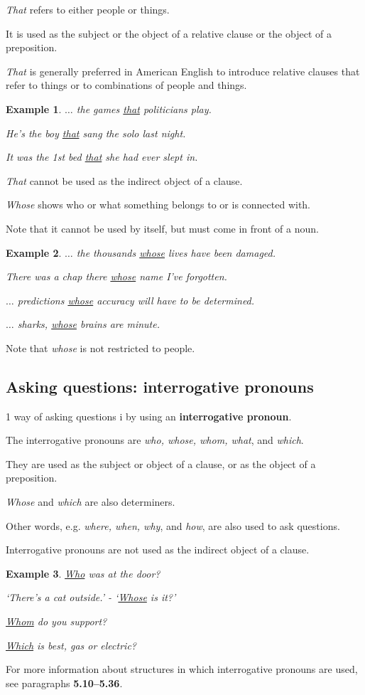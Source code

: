 \documentclass[oneside]{book}
\numberwithin{equation}{section}
\newtheorem{example}{Example}[section]
\begin{document}
%
\noindent{} \textit{That} refers to either people or things.

It is used as the subject or the object of a relative clause or the object of a preposition.

\textit{That} is generally preferred in American English to introduce relative clauses that refer to things or to combinations of people and things.
\begin{example}
    $\ldots$ the games \underline{that} politicians play.
    
    He's the boy \underline{that} sang the solo last night.
    
    It was the 1st bed \underline{that} she had ever slept in.
\end{example}
\textit{That} cannot be used as the indirect object of a clause.

%
\noindent{} \textit{Whose} shows who or what something belongs to or is connected with.

Note that it cannot be used by itself, but must come in front of a noun.
\begin{example}
    $\ldots$ the thousands \underline{whose} lives have been damaged.
    
    There was a chap there \underline{whose} name I've forgotten.
    
    $\ldots$ predictions \underline{whose} accuracy will have to be determined.
    
    $\ldots$ sharks, \underline{whose} brains are minute.
\end{example}
Note that \textit{whose} is not restricted to people.

\subsection{Asking questions: interrogative pronouns}
\noindent{} 1 way of asking questions i by using an \textbf{interrogative pronoun}.

%
The interrogative pronouns are \textit{who, whose, whom, what}, and \textit{which}.

They are used as the subject or object of a clause, or as the object of a preposition.

\textit{Whose} and \textit{which} are also determiners.

Other words, e.g. \textit{where, when, why}, and \textit{how}, are also used to ask questions.

%
Interrogative pronouns are not used as the indirect object of a clause.
\begin{example}
    \underline{Who} was at the door?
    
    `There's a cat outside.' - `\underline{Whose} is it?'
    
    \underline{Whom} do you support?
    
    \underline{Which} is best, gas or electric?
\end{example}
For more information about structures in which interrogative pronouns are used, see paragraphs \textbf{5.10--5.36}.
\end{document}
